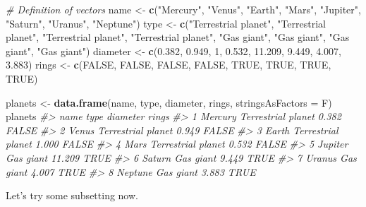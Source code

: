 \documentclass[]{book}
\newenvironment{Shaded}{\begin{snugshade}}{\end{snugshade}}
\newcommand{\CommentTok}[1]{\textcolor[rgb]{0.56,0.35,0.01}{\textit{#1}}}
\newcommand{\DataTypeTok}[1]{\textcolor[rgb]{0.13,0.29,0.53}{#1}}
\newcommand{\DecValTok}[1]{\textcolor[rgb]{0.00,0.00,0.81}{#1}}
\newcommand{\FloatTok}[1]{\textcolor[rgb]{0.00,0.00,0.81}{#1}}
\newcommand{\KeywordTok}[1]{\textcolor[rgb]{0.13,0.29,0.53}{\textbf{#1}}}
\newcommand{\NormalTok}[1]{#1}
\newcommand{\OtherTok}[1]{\textcolor[rgb]{0.56,0.35,0.01}{#1}}
\newcommand{\StringTok}[1]{\textcolor[rgb]{0.31,0.60,0.02}{#1}}
\begin{document}
\begin{Shaded}
\begin{Highlighting}[]
\CommentTok{# Definition of vectors}
\NormalTok{name <-}\StringTok{ }\KeywordTok{c}\NormalTok{(}\StringTok{"Mercury"}\NormalTok{, }\StringTok{"Venus"}\NormalTok{, }\StringTok{"Earth"}\NormalTok{, }\StringTok{"Mars"}\NormalTok{, }\StringTok{"Jupiter"}\NormalTok{, }\StringTok{"Saturn"}\NormalTok{, }\StringTok{"Uranus"}\NormalTok{, }\StringTok{"Neptune"}\NormalTok{)}
\NormalTok{type <-}\StringTok{ }\KeywordTok{c}\NormalTok{(}\StringTok{"Terrestrial planet"}\NormalTok{, }\StringTok{"Terrestrial planet"}\NormalTok{, }\StringTok{"Terrestrial planet"}\NormalTok{, }\StringTok{"Terrestrial planet"}\NormalTok{, }\StringTok{"Gas giant"}\NormalTok{, }\StringTok{"Gas giant"}\NormalTok{, }\StringTok{"Gas giant"}\NormalTok{, }\StringTok{"Gas giant"}\NormalTok{)}
\NormalTok{diameter <-}\StringTok{ }\KeywordTok{c}\NormalTok{(}\FloatTok{0.382}\NormalTok{, }\FloatTok{0.949}\NormalTok{, }\DecValTok{1}\NormalTok{, }\FloatTok{0.532}\NormalTok{, }\FloatTok{11.209}\NormalTok{, }\FloatTok{9.449}\NormalTok{, }\FloatTok{4.007}\NormalTok{, }\FloatTok{3.883}\NormalTok{)}
\NormalTok{rings <-}\StringTok{ }\KeywordTok{c}\NormalTok{(}\OtherTok{FALSE}\NormalTok{, }\OtherTok{FALSE}\NormalTok{, }\OtherTok{FALSE}\NormalTok{, }\OtherTok{FALSE}\NormalTok{, }\OtherTok{TRUE}\NormalTok{, }\OtherTok{TRUE}\NormalTok{, }\OtherTok{TRUE}\NormalTok{, }\OtherTok{TRUE}\NormalTok{)}

\NormalTok{planets <-}\StringTok{ }\KeywordTok{data.frame}\NormalTok{(name, type, diameter, rings, }\DataTypeTok{stringsAsFactors =}\NormalTok{ F)}
\NormalTok{planets}
\CommentTok{#>      name               type diameter rings}
\CommentTok{#> 1 Mercury Terrestrial planet    0.382 FALSE}
\CommentTok{#> 2   Venus Terrestrial planet    0.949 FALSE}
\CommentTok{#> 3   Earth Terrestrial planet    1.000 FALSE}
\CommentTok{#> 4    Mars Terrestrial planet    0.532 FALSE}
\CommentTok{#> 5 Jupiter          Gas giant   11.209  TRUE}
\CommentTok{#> 6  Saturn          Gas giant    9.449  TRUE}
\CommentTok{#> 7  Uranus          Gas giant    4.007  TRUE}
\CommentTok{#> 8 Neptune          Gas giant    3.883  TRUE}
\end{Highlighting}
\end{Shaded}

Let's try some subsetting now.
\end{document}

